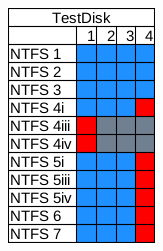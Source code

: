 \begin{figure}
\begin{subfigure}{0.16\linewidth}
        \includegraphics[width=\linewidth]{fig/testdisk_results_ntfs.png}
    \end{subfigure}
    \begin{subfigure}{0.16\linewidth}

\end{subfigure}
\end{figure}
